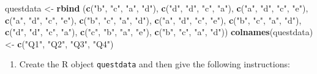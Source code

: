 \documentclass[
]{book}
\newenvironment{Shaded}{\begin{snugshade}}{\end{snugshade}}
\newcommand{\FunctionTok}[1]{\textcolor[rgb]{0.13,0.29,0.53}{\textbf{#1}}}
\newcommand{\NormalTok}[1]{#1}
\newcommand{\OtherTok}[1]{\textcolor[rgb]{0.56,0.35,0.01}{#1}}
\newcommand{\StringTok}[1]{\textcolor[rgb]{0.31,0.60,0.02}{#1}}
\providecommand{\tightlist}{%
  \setlength{\itemsep}{0pt}\setlength{\parskip}{0pt}}
\begin{document}
\begin{Shaded}
\begin{Highlighting}[]
\NormalTok{questdata }\OtherTok{\textless{}{-}} \FunctionTok{rbind}\NormalTok{ (}\FunctionTok{c}\NormalTok{(}\StringTok{"b"}\NormalTok{, }\StringTok{"c"}\NormalTok{, }\StringTok{"a"}\NormalTok{, }\StringTok{"d"}\NormalTok{),}
                    \FunctionTok{c}\NormalTok{(}\StringTok{"d"}\NormalTok{, }\StringTok{"d"}\NormalTok{, }\StringTok{"c"}\NormalTok{, }\StringTok{"a"}\NormalTok{),}
                    \FunctionTok{c}\NormalTok{(}\StringTok{"a"}\NormalTok{, }\StringTok{"d"}\NormalTok{, }\StringTok{"c"}\NormalTok{, }\StringTok{"e"}\NormalTok{),}
                    \FunctionTok{c}\NormalTok{(}\StringTok{"a"}\NormalTok{, }\StringTok{"d"}\NormalTok{, }\StringTok{"c"}\NormalTok{, }\StringTok{"e"}\NormalTok{),}
                    \FunctionTok{c}\NormalTok{(}\StringTok{"b"}\NormalTok{, }\StringTok{"c"}\NormalTok{, }\StringTok{"a"}\NormalTok{, }\StringTok{"d"}\NormalTok{),}
                    \FunctionTok{c}\NormalTok{(}\StringTok{"a"}\NormalTok{, }\StringTok{"d"}\NormalTok{, }\StringTok{"c"}\NormalTok{, }\StringTok{"e"}\NormalTok{),}
                    \FunctionTok{c}\NormalTok{(}\StringTok{"b"}\NormalTok{, }\StringTok{"c"}\NormalTok{, }\StringTok{"a"}\NormalTok{, }\StringTok{"d"}\NormalTok{),}
                    \FunctionTok{c}\NormalTok{(}\StringTok{"d"}\NormalTok{, }\StringTok{"d"}\NormalTok{, }\StringTok{"c"}\NormalTok{, }\StringTok{"a"}\NormalTok{),}
                    \FunctionTok{c}\NormalTok{(}\StringTok{"c"}\NormalTok{, }\StringTok{"b"}\NormalTok{, }\StringTok{"a"}\NormalTok{, }\StringTok{"e"}\NormalTok{),}
                    \FunctionTok{c}\NormalTok{(}\StringTok{"b"}\NormalTok{, }\StringTok{"c"}\NormalTok{, }\StringTok{"a"}\NormalTok{, }\StringTok{"d"}\NormalTok{))}
\FunctionTok{colnames}\NormalTok{(questdata) }\OtherTok{\textless{}{-}} \FunctionTok{c}\NormalTok{(}\StringTok{"Q1"}\NormalTok{, }\StringTok{"Q2"}\NormalTok{, }\StringTok{"Q3"}\NormalTok{, }\StringTok{"Q4"}\NormalTok{)}
\end{Highlighting}
\end{Shaded}

\begin{enumerate}
\def\labelenumi{(\roman{enumi})}
\tightlist
\item
  Create the R object \texttt{questdata} and then give the following instructions:
\end{enumerate}
\end{document}
